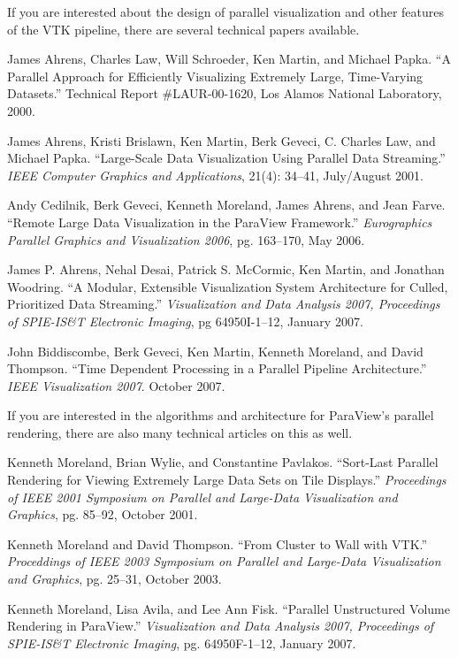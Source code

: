 If you are interested about the design of parallel visualization and other
features of the VTK pipeline, there are several technical papers available.

\begin{reflist}
\item James Ahrens, Charles Law, Will Schroeder, Ken Martin, and Michael
  Papka.  ``A Parallel Approach for Efficiently Visualizing Extremely Large,
  Time-Varying Datasets.''  Technical Report \#LAUR-00-1620, Los Alamos
  National Laboratory, 2000.
\item James Ahrens, Kristi Brislawn, Ken Martin, Berk Geveci, C. Charles
  Law, and Michael Papka.  ``Large-Scale Data Visualization Using Parallel
  Data Streaming.''  \emph{IEEE Computer Graphics and Applications}, 21(4):
  34–41, July/August 2001.
\item Andy Cedilnik, Berk Geveci, Kenneth Moreland, James Ahrens, and Jean
  Farve.  ``Remote Large Data Visualization in the ParaView Framework.''
  \emph{Eurographics Parallel Graphics and Visualization 2006},
  pg. 163–170, May 2006.
\item James P. Ahrens, Nehal Desai, Patrick S. McCormic, Ken Martin, and
  Jonathan Woodring.  ``A Modular, Extensible Visualization System
  Architecture for Culled, Prioritized Data Streaming.''
  \emph{Visualization and Data Analysis 2007, Proceedings of SPIE-IS\&T
    Electronic Imaging}, pg 64950I-1–12, January 2007.
\item John Biddiscombe, Berk Geveci, Ken Martin, Kenneth Moreland, and
  David Thompson.  ``Time Dependent Processing in a Parallel Pipeline
  Architecture.'' \emph{IEEE Visualization 2007}.  October 2007.
\end{reflist}

If you are interested in the algorithms and architecture for ParaView's
parallel rendering, there are also many technical articles on this as well.

\begin{reflist}
\item Kenneth Moreland, Brian Wylie, and Constantine Pavlakos.  ``Sort-Last
  Parallel Rendering for Viewing Extremely Large Data Sets on Tile
  Displays.''  \emph{Proceedings of IEEE 2001 Symposium on Parallel and
    Large-Data Visualization and Graphics}, pg. 85–92, October 2001.
\item Kenneth Moreland and David Thompson.  ``From Cluster to Wall with
  VTK.''  \emph{Proceddings of IEEE 2003 Symposium on Parallel and
    Large-Data Visualization and Graphics}, pg. 25–31, October 2003.
\item Kenneth Moreland, Lisa Avila, and Lee Ann Fisk.  ``Parallel
  Unstructured Volume Rendering in ParaView.''  \emph{Visualization and Data
  Analysis 2007, Proceedings of SPIE-IS\&T Electronic Imaging},
  pg. 64950F-1–12, January 2007.
\end{reflist}


